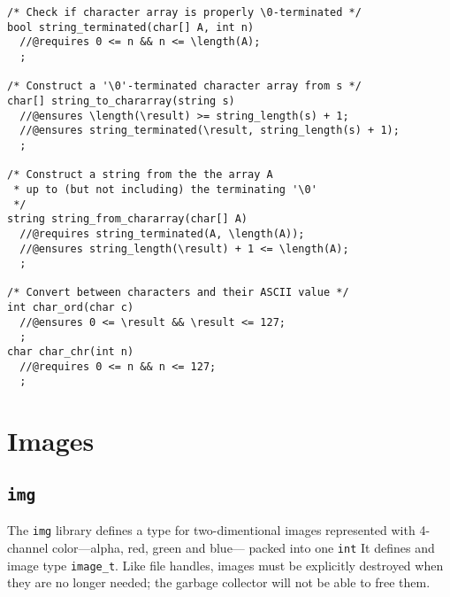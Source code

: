 \documentclass[11pt]{article}
\renewcommand{\_}{\char`\_}
\renewcommand{\{}{\char`\{}
\renewcommand{\}}{\char`\}}
\begin{document}
\begin{small}
\begin{verbatim}
/* Check if character array is properly \0-terminated */
bool string_terminated(char[] A, int n)
  //@requires 0 <= n && n <= \length(A);
  ;

/* Construct a '\0'-terminated character array from s */
char[] string_to_chararray(string s)
  //@ensures \length(\result) >= string_length(s) + 1;
  //@ensures string_terminated(\result, string_length(s) + 1);
  ;

/* Construct a string from the the array A
 * up to (but not including) the terminating '\0'
 */
string string_from_chararray(char[] A)
  //@requires string_terminated(A, \length(A));
  //@ensures string_length(\result) + 1 <= \length(A);
  ;

/* Convert between characters and their ASCII value */
int char_ord(char c)
  //@ensures 0 <= \result && \result <= 127;
  ;
char char_chr(int n)
  //@requires 0 <= n && n <= 127;
  ;
\end{verbatim}
\end{small}

\section{Images}

\subsection{\tt img}

The \verb'img' library defines a type for two-dimentional images
represented with 4-channel color---alpha, red, green and blue---
packed into one \verb'int'  It defines and image type \verb'image_t'.
Like file handles, images must be explicitly destroyed when they
are no longer needed; the garbage collector will not be able to
free them.
\end{document}
